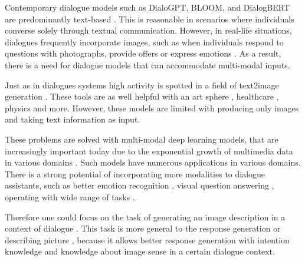 \documentclass[11pt]{article}
\begin{document}
\smallskip

Contemporary dialogue models such as DialoGPT, BLOOM, and DialogBERT are predominantly text-based \cite{zhang2019dialogpt,Scao-2022,Gu-2020}. This is reasonable in scenarios where individuals converse solely through textual communication. However, in real-life situations, dialogues frequently incorporate images, such as when individuals respond to questions with photographs, provide offers or  express emotions \cite{mm_chat}. As a result, there is a need for dialogue models that can accommodate multi-modal inputs. 

\smallskip

Just as in dialogues systems high activity is spotted in a field of text2image generation \cite{imagen,stable-diffusion,Dalle}. These tools are as well helpful with an art sphere \cite{AI-art}, healthcare \cite{chen2022generative}, physics \cite{manyar2023physics} and more. However, these models are limited with producing only images and taking text information as input. 


\medskip

These problems are solved with multi-modal deep learning models, that are increasingly important today due to the exponential growth of multimedia data in various domains \cite{Tadas_multimodal,mulit-modal-review,multi-modal-explainability,multi-modal-fusion}.
Such models have numerous applications in various domains. %
There is a strong potential of incorporating more modalities to dialogue assistants, such as better emotion recognition \cite{emotion-multimodal}, visual question answering \cite{vqa-multimodal,blip}, operating with wide range of tasks \cite{GATO,flamingo,kosmos-1}.   





\smallskip

Therefore one could focus on the task of generating an image description in a context of dialogue \cite{Lee-2021,mm_chat}. This task is more general to the response generation \cite{chat-gpt} or describing picture \cite{blip2}, because it allows better response generation with intention knowledge and knowledge about image sense in a certain dialogue context.

\smallskip
\end{document}

